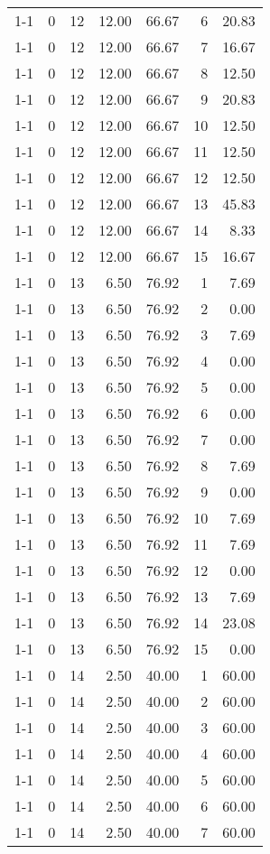 \begin{tabular}{lrrrrrr}
1-1 & 0 & 12 & 12.00 & 66.67 & 6 & 20.83 \\
1-1 & 0 & 12 & 12.00 & 66.67 & 7 & 16.67 \\
1-1 & 0 & 12 & 12.00 & 66.67 & 8 & 12.50 \\
1-1 & 0 & 12 & 12.00 & 66.67 & 9 & 20.83 \\
1-1 & 0 & 12 & 12.00 & 66.67 & 10 & 12.50 \\
1-1 & 0 & 12 & 12.00 & 66.67 & 11 & 12.50 \\
1-1 & 0 & 12 & 12.00 & 66.67 & 12 & 12.50 \\
1-1 & 0 & 12 & 12.00 & 66.67 & 13 & 45.83 \\
1-1 & 0 & 12 & 12.00 & 66.67 & 14 & 8.33 \\
1-1 & 0 & 12 & 12.00 & 66.67 & 15 & 16.67 \\
1-1 & 0 & 13 & 6.50 & 76.92 & 1 & 7.69 \\
1-1 & 0 & 13 & 6.50 & 76.92 & 2 & 0.00 \\
1-1 & 0 & 13 & 6.50 & 76.92 & 3 & 7.69 \\
1-1 & 0 & 13 & 6.50 & 76.92 & 4 & 0.00 \\
1-1 & 0 & 13 & 6.50 & 76.92 & 5 & 0.00 \\
1-1 & 0 & 13 & 6.50 & 76.92 & 6 & 0.00 \\
1-1 & 0 & 13 & 6.50 & 76.92 & 7 & 0.00 \\
1-1 & 0 & 13 & 6.50 & 76.92 & 8 & 7.69 \\
1-1 & 0 & 13 & 6.50 & 76.92 & 9 & 0.00 \\
1-1 & 0 & 13 & 6.50 & 76.92 & 10 & 7.69 \\
1-1 & 0 & 13 & 6.50 & 76.92 & 11 & 7.69 \\
1-1 & 0 & 13 & 6.50 & 76.92 & 12 & 0.00 \\
1-1 & 0 & 13 & 6.50 & 76.92 & 13 & 7.69 \\
1-1 & 0 & 13 & 6.50 & 76.92 & 14 & 23.08 \\
1-1 & 0 & 13 & 6.50 & 76.92 & 15 & 0.00 \\
1-1 & 0 & 14 & 2.50 & 40.00 & 1 & 60.00 \\
1-1 & 0 & 14 & 2.50 & 40.00 & 2 & 60.00 \\
1-1 & 0 & 14 & 2.50 & 40.00 & 3 & 60.00 \\
1-1 & 0 & 14 & 2.50 & 40.00 & 4 & 60.00 \\
1-1 & 0 & 14 & 2.50 & 40.00 & 5 & 60.00 \\
1-1 & 0 & 14 & 2.50 & 40.00 & 6 & 60.00 \\
1-1 & 0 & 14 & 2.50 & 40.00 & 7 & 60.00 \\

\end{tabular}
